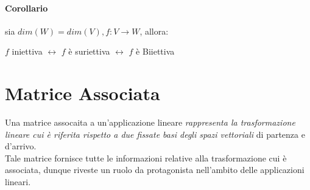\paragraph{Corollario} sia $dim(W)=dim(V), f:V\to W$, allora:
\begin{center}
	$f$ iniettiva $\leftrightarrow$ $f$ è suriettiva $\leftrightarrow$ $f$ è Biiettiva
\end{center}

\section{Matrice Associata}
Una matrice assocaita a un'applicazione lineare \emph{rappresenta la trasformazione lineare cui è riferita rispetto a due fissate basi degli spazi vettoriali} di partenza e d'arrivo.
\\Tale matrice fornisce tutte le informazioni relative alla trasformazione cui è associata, dunque riveste un ruolo da protagonista nell'ambito delle applicazioni lineari.


